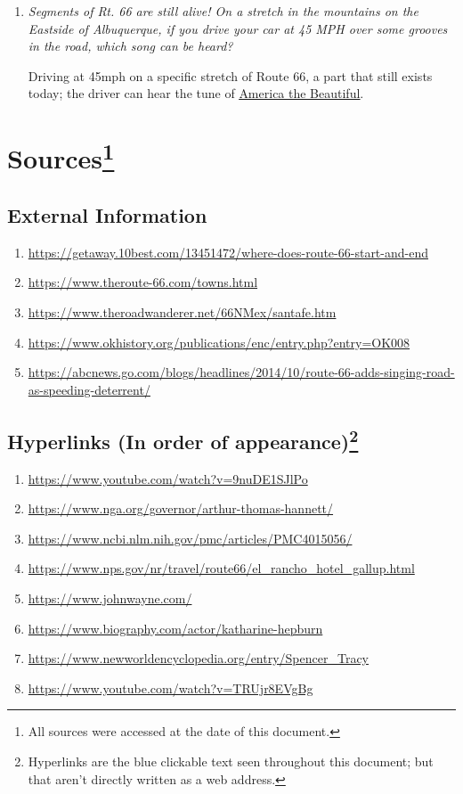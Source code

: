 \documentclass[12pt]{article}
\begin{document}
\begin{enumerate}
\begin{addmargin}[24pt]{0in}
        \end{addmargin}
    \item{\textit{Segments of Rt. 66 are still alive! On a stretch in the mountains on the Eastside of Albuquerque, if you drive your car at 45 MPH over some grooves in the road, which song can be heard?}}
        \begin{addmargin}[24pt]{0in}
            Driving at 45mph on a specific stretch of Route 66, a part that still exists today; the driver can hear the tune of {\color{blue}\underline{\href{https://www.youtube.com/watch?v=TRUjr8EVgBg}{America the Beautiful}}}.
        \end{addmargin}
\end{enumerate}

\newpage

\section*{Sources\footnote{All sources were accessed at the date of this document.}}
\subsection*{External Information}
\begin{enumerate}
    \item{\url{https://getaway.10best.com/13451472/where-does-route-66-start-and-end}}
    \item{\url{https://www.theroute-66.com/towns.html}}
    \item{\url{https://www.theroadwanderer.net/66NMex/santafe.htm}}\label{reroute}
    \item{\url{https://www.okhistory.org/publications/enc/entry.php?entry=OK008}}
    \item{\url{https://abcnews.go.com/blogs/headlines/2014/10/route-66-adds-singing-road-as-speeding-deterrent/}}
\end{enumerate}
\subsection*{Hyperlinks (In order of appearance)\footnote{Hyperlinks are the blue clickable text seen throughout this document; but that aren't directly written as a web address.}}
\begin{enumerate}
    \item{\url{https://www.youtube.com/watch?v=9nuDE1SJlPo}}
    \item{\url{https://www.nga.org/governor/arthur-thomas-hannett/}}
    \item{\url{https://www.ncbi.nlm.nih.gov/pmc/articles/PMC4015056/}}
    \item{\url{https://www.nps.gov/nr/travel/route66/el_rancho_hotel_gallup.html}}
    \item{\url{https://www.johnwayne.com/}}
    \item{\url{https://www.biography.com/actor/katharine-hepburn}}
    \item{\url{https://www.newworldencyclopedia.org/entry/Spencer_Tracy}}
    \item{\url{https://www.youtube.com/watch?v=TRUjr8EVgBg}}
\end{enumerate}
\end{document}
